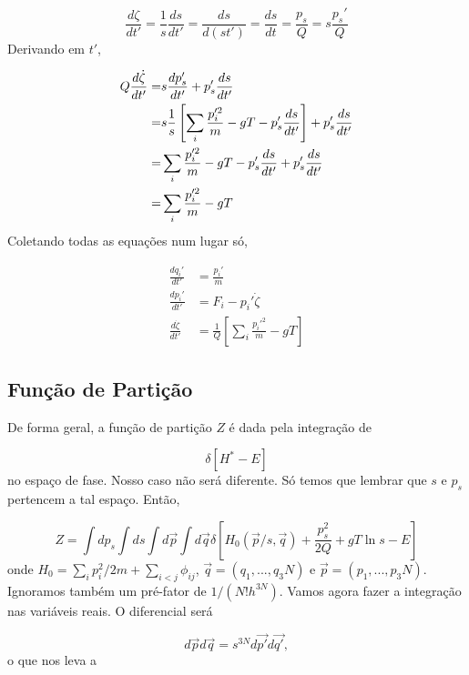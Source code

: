 \documentclass[twoside, a4paper]{scrartcl}
\newcommand{\phiij}{\phi_{ij}}
\newcommand{\deri}[2]{\frac{d #1}{d #2}}
\begin{document}
\begin{equation}
	\deri{\zeta}{t'} = \frac{1}{s}\deri{s}{t'} = \deri{s}{(st')} = \deri{s}{t} = \frac{p_s}{Q} = s \frac{p_s'}{Q}
\end{equation}
Derivando em $t'$,

\begin{align}
	Q \deri{\dot{\zeta}}{t'} =& s \deri{p_s'}{t'} + p_s' \deri{s}{t'} \notag \\
		=& s \frac{1}{s} \left[ \sum_i \frac{p_i'^2}{m} -gT -p_s' \deri{s}{t'}\right] + p_s' \deri{s}{t'} \notag \\
		=& \sum_i \frac{p_i'^2}{m} -gT -p_s' \deri{s}{t'} + p_s' \deri{s}{t'} \notag \\
		=& \sum_i \frac{p_i'^2}{m} - gT 
\end{align}
Coletando todas as equações num lugar só,

\begin{align}
	\deri{q_i'}{t'} &= \frac{p_i'}{m} \\
	\deri{p_i'}{t'} &= F_i - p_i' \dot{\zeta} \\
	\deri{\dot{\zeta}}{t'} &=  \frac{1}{Q} \left[\sum_i \frac{p_i'^2}{m} - gT\right] 
\end{align}

\subsection{Função de Partição}

De forma geral, a função de partição $Z$ é dada pela integração de 

\begin{equation}
	\delta[H^* - E] 
\end{equation}
no espaço de fase. Nosso caso não será diferente. Só temos que lembrar que $s$ e $p_s$ pertencem a tal espaço. Então,

\begin{equation}
	Z = \int dp_s \int ds \int d\vec{p} \int d\vec{q} \delta\left[H_0(\vec{p}/s, \vec{q}) + \frac{p_s^2}{2Q} + gT \ln s -E \right]
\end{equation}
onde $H_0 = \sum_i p_i^2/2m + \sum_{i<j} \phiij$, $\vec{q} = (q_1,..., q_3N)$ e $\vec{p} = (p_1,..., p_3N)$. Ignoramos também um pré-fator de $1/(N!h^{3N})$. Vamos agora fazer a integração nas variáveis reais. O diferencial será

\begin{equation}
	d\vec{p} d\vec{q} =s^{3N} d\vec{p'} d\vec{q'},
\end{equation}
o que nos leva a 
\end{document}
